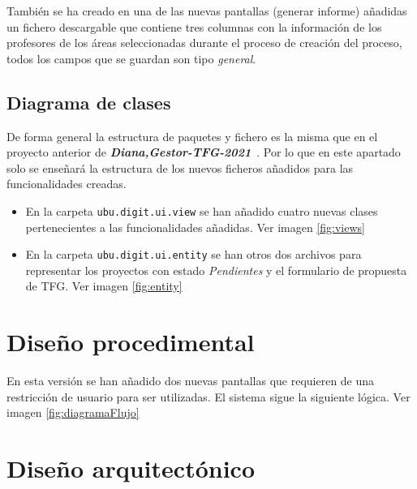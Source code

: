 También se ha creado en una de las nuevas pantallas (generar informe) añadidas un fichero descargable que contiene tres columnas con la información de los profesores de los áreas seleccionadas durante el proceso de creación del proceso, todos los campos que se guardan son tipo \emph{general}.

\subsection{Diagrama de clases}

De forma general la estructura de paquetes y fichero es la misma que en el proyecto anterior de \textbf{\textit{Diana,Gestor-TFG-2021}}~\cite{Gestor-TFG-2021}. Por lo que en este apartado solo se enseñará la estructura de los nuevos ficheros añadidos para las funcionalidades creadas.

\begin{itemize}
	\item En la carpeta \texttt{ubu.digit.ui.view} se han añadido cuatro nuevas clases pertenecientes a las funcionalidades añadidas. Ver imagen \ref{fig:views}
	
	
	\item En la carpeta \texttt{ubu.digit.ui.entity} se han otros dos archivos para representar los proyectos con estado \emph{Pendientes} y el formulario de propuesta de TFG. Ver imagen \ref{fig:entity}
	
	
\end{itemize}

\section{Diseño procedimental}
En esta versión se han añadido dos nuevas pantallas que requieren de una restricción de usuario para ser utilizadas.
El sistema sigue la siguiente lógica. Ver imagen \ref{fig:diagramaFlujo}


\section{Diseño arquitectónico}


